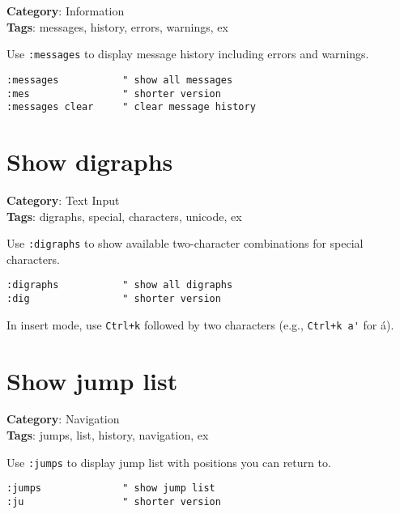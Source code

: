 {{{{{{\textbf{Category}: Information\\ \textbf{Tags}: messages, history, errors, warnings, ex
\vspace{0.5cm}

Use {\footnotesize \Verb§:messages§} to display message history including errors and warnings.

\begin{Exa*}{}
\begin{Verbatim}[fontsize=\footnotesize, breaklines, breakanywhere]
:messages           " show all messages
:mes                " shorter version
:messages clear     " clear message history
\end{Verbatim}
\end{Exa*}

\section{Show digraphs}

\textbf{Category}: Text Input\\ \textbf{Tags}: digraphs, special, characters, unicode, ex
\vspace{0.5cm}

Use {\footnotesize \Verb§:digraphs§} to show available two-character combinations for special characters.

\begin{Exa*}{}
\begin{Verbatim}[fontsize=\footnotesize, breaklines, breakanywhere]
:digraphs           " show all digraphs
:dig                " shorter version
\end{Verbatim}
\end{Exa*}

In insert mode, use {\footnotesize \Verb§Ctrl+k§} followed by two characters (e.g., {\footnotesize \Verb§Ctrl+k a'§} for á).

\section{Show jump list}

\textbf{Category}: Navigation\\ \textbf{Tags}: jumps, list, history, navigation, ex
\vspace{0.5cm}

Use {\footnotesize \Verb§:jumps§} to display jump list with positions you can return to.

\begin{Exa*}{}
\begin{Verbatim}[fontsize=\footnotesize, breaklines, breakanywhere]
:jumps              " show jump list
:ju                 " shorter version
\end{Verbatim}
\end{Exa*}

}}}}}}
